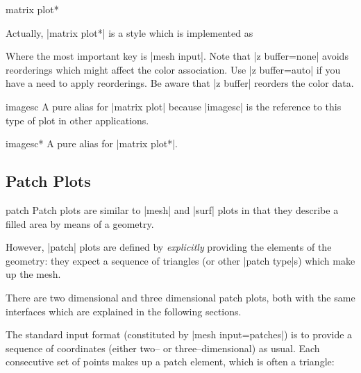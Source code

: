 {\begin{plottype}{matrix plot*}
\begin{codeexample}[]
\end{codeexample}
	Actually, |matrix plot*| is a style which is implemented as
\begin{codeexample}
\end{codeexample}
	Where the most important key is |mesh input|. Note that |z buffer=none| avoids reorderings which might affect the color association. Use |z buffer=auto| if you have a need to apply reorderings. Be aware that |z buffer| reorders the color data. 
\end{plottype}

\begin{plottype}{imagesc}
	A pure alias for |matrix plot| because |imagesc| is the reference to this type of plot in other applications.
\end{plottype}

\begin{plottype}{imagesc*}
	A pure alias for |matrix plot*|.
\end{plottype}



\subsection{Patch Plots}
\label{sec:pgfplots:3d:patch}
\begin{plottype}[/pgfplots]{patch}
	Patch plots are similar to |mesh| and |surf| plots in that they describe a filled area by means of a geometry.

	However, |patch| plots are defined by \emph{explicitly} providing the elements of the geometry: they expect a sequence of triangles (or other |patch type|s) which make up the mesh.

	There are two dimensional and three dimensional patch plots, both with the same interfaces which are explained in the following sections.

	The standard input format (constituted by |mesh input=patches|) is to provide a sequence of coordinates (either two-- or three--dimensional) as usual. Each consecutive set of points makes up a patch element, which is often a triangle:
\begin{codeexample}[]
\end{codeexample}
\end{plottype}}
